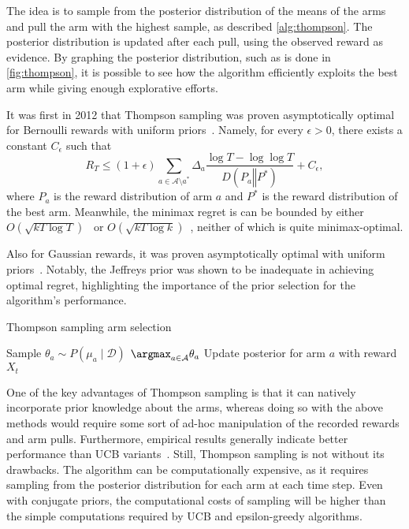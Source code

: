 The idea is to sample from the posterior distribution of the means of the arms and pull the arm with the highest sample, as described \cref{alg:thompson}.
The posterior distribution is updated after each pull, using the observed reward as evidence.
By graphing the posterior distribution, such as is done in \cref{fig:thompson}, it is possible to see how the algorithm efficiently exploits the best arm while giving enough explorative efforts.

It was first in 2012 that Thompson sampling was proven asymptotically optimal for Bernoulli rewards with uniform priors~\autocite{kaufmann2012}.
Namely, for every $\epsilon > 0$, there exists a constant $C_\epsilon$ such that
\begin{equation}
    R_T
    \leq
    (1 + \epsilon)
    \sum_{a \in \mathcal{A} \setminus a^*}
    \Delta_a \frac{\log T - \log \log T}{D(P_a \mathrel{\Vert} P^*)}
    + C_\epsilon,
\end{equation}
where $P_a$ is the reward distribution of arm $a$ and $P^*$ is the reward distribution of the best arm.
Meanwhile, the minimax regret is can be bounded by either $O(\sqrt{kT \log T})$~\autocite{agrawal2013} or $O(\sqrt{kT \log k})$~\autocite{agrawal2017}, neither of which is quite minimax-optimal.

Also for Gaussian rewards, it was proven asymptotically optimal with uniform priors~\autocite{honda2014}.
Notably, the Jeffreys prior was shown to be inadequate in achieving optimal regret, highlighting the importance of the prior selection for the algorithm's performance.

\begin{algorithm}
    \caption{Thompson sampling arm selection}
    \label{alg:thompson}
    \begin{algorithmic}
        \State Sample $\theta_a \sim P(\mu_a \mid \mathcal{D})$
        \EndFor
        \State \Return $\argmax_{a \in \mathcal{A}} \theta_a$
        \State Update posterior for arm $a$ with reward $X_t$
    \end{algorithmic}
\end{algorithm}

One of the key advantages of Thompson sampling is that it can natively incorporate prior knowledge about the arms, whereas doing so with the above methods would require some sort of ad-hoc manipulation of the recorded rewards and arm pulls.
Furthermore, empirical results generally indicate better performance than UCB variants~\autocite{kaufmann2012}.
Still, Thompson sampling is not without its drawbacks.
The algorithm can be computationally expensive, as it requires sampling from the posterior distribution for each arm at each time step.
Even with conjugate priors, the computational costs of sampling will be higher than the simple computations required by UCB and epsilon-greedy algorithms.

